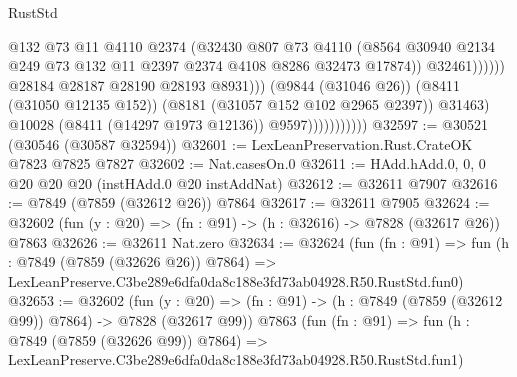 \begin{lexlean}{RustStd}
\begin{coremodule}
                                              @132
                                              @73
                                              @11
                                              @4110
                                              @2374
                                              (@32430
                                                @807
                                                @73
                                                @4110
                                                (@8564
                                                  @30940
                                                  @2134
                                                  @249
                                                  @73
                                                  @132
                                                  @11
                                                  @2397
                                                  @2374
                                                  @4108
                                                  @8286
                                                  @32473
                                                  @17874))
                                              @32461))))))
                                  @28184
                                  @28187
                                  @28190
                                  @28193
                                  @8931)))
                            (@9844 (@31046 @26))
                            (@8411 (@31050 @12135 @152))
                            (@8181 (@31057 @152 @102 @2965 @2397))
                            @31463)
                          @10028
                          (@8411 (@14297 @1973 @12136))
                          @9597)))))))))))
@32597 := @30521 (@30546 (@30587 @32594))
@32601 := LexLeanPreservation.Rust.CrateOK @7823 @7825 @7827
@32602 := Nat.casesOn.{0}
@32611 := HAdd.hAdd.{0, 0, 0} @20 @20 @20 (instHAdd.{0} @20 instAddNat)
@32612 := @32611 @7907
@32616 := @7849 (@7859 (@32612 @26)) @7864
@32617 := @32611 @7905
@32624 := @32602 (fun (y : @20) => (fn : @91) -> (h : @32616) -> @7828 (@32617 @26)) @7863
@32626 := @32611 Nat.zero
@32634 := @32624
    (fun (fn : @91) =>
    fun (h : @7849 (@7859 (@32626 @26)) @7864) =>
    LexLeanPreserve.C3be289e6dfa0da8c188e3fd73ab04928.R50.RustStd.fun0)
@32653 := @32602
    (fun (y : @20) => (fn : @91) -> (h : @7849 (@7859 (@32612 @99)) @7864) -> @7828 (@32617 @99))
    @7863
    (fun (fn : @91) =>
    fun (h : @7849 (@7859 (@32626 @99)) @7864) =>
    LexLeanPreserve.C3be289e6dfa0da8c188e3fd73ab04928.R50.RustStd.fun1)

\end{coremodule}
\end{lexlean}
